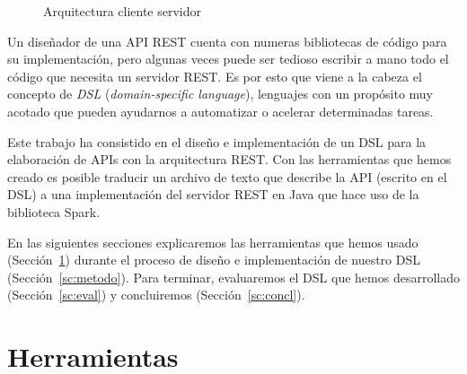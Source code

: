 \documentclass[runningheads]{llncs}
\begin{document}
\begin{figure}
\begin{center}
\end{center}
\caption{Arquitectura cliente servidor}
\label{fig:arq-cliente-serv}
\end{figure}

Un diseñador de una API REST cuenta con numeras bibliotecas de código
para su implementación, pero algunas veces puede ser tedioso escribir a
mano todo el código que necesita un servidor REST. Es por esto que viene
a la cabeza el concepto de \emph{DSL} (\emph{domain-specific language}),
lenguajes con un propósito muy acotado que pueden ayudarnos a automatizar
o acelerar determinadas tareas.

Este trabajo ha consistido en el diseño e implementación de un DSL para
la elaboración de APIs con la arquitectura REST. Con las herramientas
que hemos creado es posible traducir un archivo de texto que describe
la API (escrito en el DSL) a una implementación del servidor REST en
Java que hace uso de la biblioteca Spark.

En las siguientes secciones explicaremos las herramientas que hemos
usado (Sección~\ref{sc:herramientas}) durante el proceso de diseño
e implementación de nuestro DSL (Sección~\ref{sc:metodo}).
%
%
Para terminar, evaluaremos el
DSL que hemos desarrollado (Sección~\ref{sc:eval}) y concluiremos
(Sección~\ref{sc:concl}).

\section{Herramientas}
\label{sc:herramientas}
\end{document}
